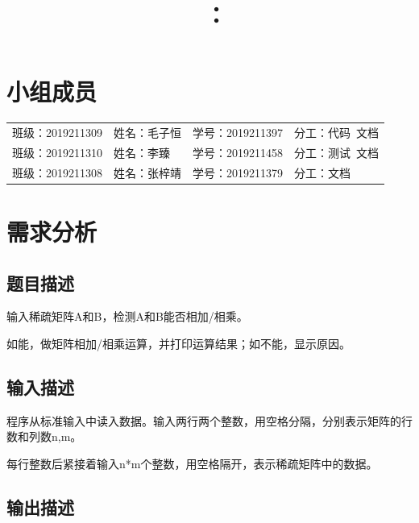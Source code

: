 \documentclass{article}
\title{\hmwkClass\ ：\hmwkTitle}
\author{\hmwkAuthorName}
\begin{document}
\maketitle  

\section*{小组成员}

\setlength{\tabcolsep}{9mm}
{
    \begin{table}[htbp]
        \centering
        \begin{tabular}{llll}
            班级：2019211309 & 姓名：毛子恒 & 学号：2019211397 & 分工：代码\ 文档 \\
            
            班级：2019211310 & 姓名：李臻   & 学号：2019211458 & 分工：测试\ 文档 \\
            
            班级：2019211308 & 姓名：张梓靖 & 学号：2019211379 & 分工：文档       \\
        \end{tabular}
    \end{table}
}

\tableofcontents
\newpage

\section{需求分析}

\subsection{题目描述}

输入稀疏矩阵A和B，检测A和B能否相加/相乘。

如能，做矩阵相加/相乘运算，并打印运算结果；如不能，显示原因。

\subsection{输入描述}

程序从标准输入中读入数据。输入两行两个整数，用空格分隔，分别表示矩阵的行数和列数n,m。

每行整数后紧接着输入n*m个整数，用空格隔开，表示稀疏矩阵中的数据。

\subsection{输出描述}
\end{document}
